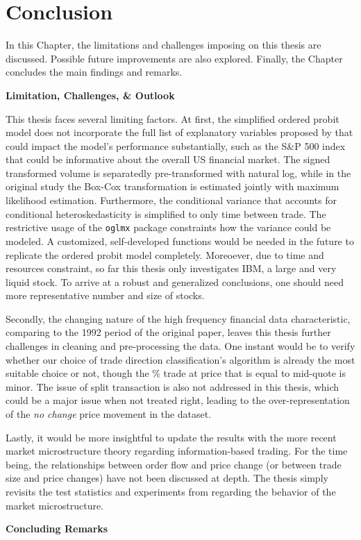 \chapter{Conclusion}\label{chap:conclusion}
In this Chapter, the limitations and challenges imposing on this thesis are discussed. Possible future improvements are also explored. Finally, the Chapter concludes the main findings and remarks. 

\vspace{5mm}
{\noindent\bfseries Limitation, Challenges, \& Outlook }

This thesis faces several limiting factors. At first, the simplified ordered probit model does not incorporate the full list of explanatory variables proposed by \citet{hausman1992} that could impact the model's performance substantially, such as the S\&P 500 index that could be informative about the overall US financial market. The signed transformed volume is separatedly pre-transformed with natural log, while in the original study the Box-Cox transformation is estimated jointly with maximum likelihood estimation. Furthermore, the conditional variance that accounts for conditional heteroskedasticity is simplified to only time between trade. The restrictive usage of the \verb|oglmx| package constraints how the variance could be modeled. A customized, self-developed functions would be needed in the future to replicate the ordered probit model completely. Moreoever, due to time and resources constraint, so far this thesis only investigates IBM, a large and very liquid stock. To arrive at a robust and generalized conclusions, one should need more representative number and size of stocks. 

Secondly, the changing nature of the high frequency financial data characteristic, comparing to the 1992 period of the original paper, leaves this thesis further challenges in cleaning and pre-processing the data. One instant would be to verify whether our choice of trade direction classification's algorithm is already the most suitable choice or not, though the \% trade at price that is equal to mid-quote is minor. The issue of split transaction \citep{hautsch2012} is also not addressed in this thesis, which could be a major issue when not treated right, leading to the over-representation of the \textit{no change} price movement in the dataset.

Lastly, it would be more insightful to update the results with the more recent market microstructure theory regarding information-based trading. For the time being, the relationships between order flow and price change (or between trade size and price changes) have not been discussed at depth. The thesis simply revisits the test statistics and experiments from \citet{hausman1992} regarding the behavior of the market microstructure.




{\noindent\bfseries Concluding Remarks }

